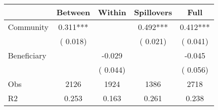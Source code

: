 
\begin{tabular}{l*{4}{c}}\hline&\multicolumn{1}{c}{Between}&\multicolumn{1}{c}{Within}&\multicolumn{1}{c}{Spillovers}&\multicolumn{1}{c}{Full}\\ \hline
 Community             &              0.311***      &                                               &        0.492*** &         0.412***                            \\ 
                               &        (       0.018)           &                                       &       (       0.021)     &      (       0.041)                                           \\ 
 Beneficiary   &                                               &       -0.029    &                                &            -0.045                            \\ 
                               &                                               & (       0.044)                  &                                        &      (       0.056)                                           \\ 
\hline                                                                                                                                                                                                                                            
 Obs                   &               2126               &       1924                       &       1386                &              2718                                               \\ 
 R2                    &                      0.253              &              0.163                      &              0.261               &                     0.238                                              \\ 
\hline \end{tabular}                                                                                                                                                                                                              